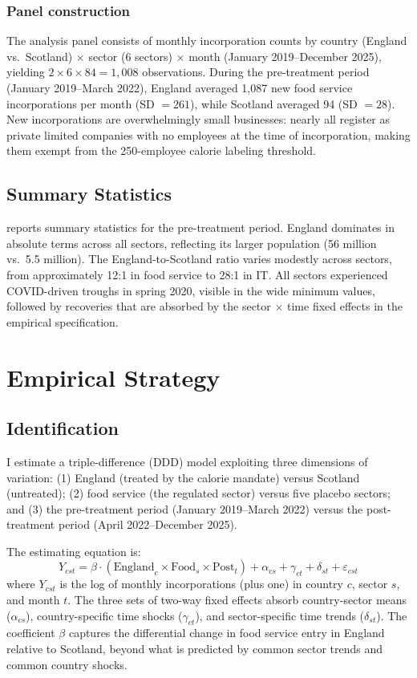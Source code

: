 \documentclass[12pt]{article}
\begin{document}
\subsubsection*{Panel construction} The analysis panel consists of monthly incorporation counts by country (England vs.\ Scotland) $\times$ sector (6 sectors) $\times$ month (January 2019--December 2025), yielding $2 \times 6 \times 84 = 1{,}008$ observations. During the pre-treatment period (January 2019--March 2022), England averaged 1,087 new food service incorporations per month (SD $= 261$), while Scotland averaged 94 (SD $= 28$). New incorporations are overwhelmingly small businesses: nearly all register as private limited companies with no employees at the time of incorporation, making them exempt from the 250-employee calorie labeling threshold.

\subsection{Summary Statistics}



 reports summary statistics for the pre-treatment period. England dominates in absolute terms across all sectors, reflecting its larger population (56 million vs.\ 5.5 million). The England-to-Scotland ratio varies modestly across sectors, from approximately 12:1 in food service to 28:1 in IT. All sectors experienced COVID-driven troughs in spring 2020, visible in the wide minimum values, followed by recoveries that are absorbed by the sector $\times$ time fixed effects in the empirical specification.

\section{Empirical Strategy}

\subsection{Identification}

I estimate a triple-difference (DDD) model exploiting three dimensions of variation: (1) England (treated by the calorie mandate) versus Scotland (untreated); (2) food service (the regulated sector) versus five placebo sectors; and (3) the pre-treatment period (January 2019--March 2022) versus the post-treatment period (April 2022--December 2025).

The estimating equation is:
\begin{equation}
\label{eq:ddd}
Y_{cst} = \beta \cdot (\text{England}_c \times \text{Food}_s \times \text{Post}_t) + \alpha_{cs} + \gamma_{ct} + \delta_{st} + \varepsilon_{cst}
\end{equation}
where $Y_{cst}$ is the log of monthly incorporations (plus one) in country $c$, sector $s$, and month $t$. The three sets of two-way fixed effects absorb country-sector means ($\alpha_{cs}$), country-specific time shocks ($\gamma_{ct}$), and sector-specific time trends ($\delta_{st}$). The coefficient $\beta$ captures the differential change in food service entry in England relative to Scotland, beyond what is predicted by common sector trends and common country shocks.
\end{document}
